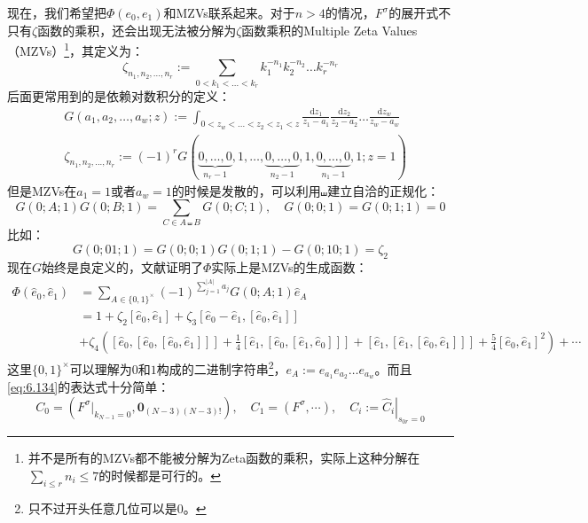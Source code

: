 现在，我们希望把$\Phi(e_0,e_1)$和MZVs联系起来。对于$n>4$的情况，$F^\sigma$的展开式不只有$\zeta$函数的乘积，还会出现无法被分解为$\zeta$函数乘积的Multiple Zeta Values（MZVs）\footnote{并不是所有的MZVs都不能被分解为Zeta函数的乘积，实际上这种分解在$\sum_{i\leq r} n_i \leq 7$的时候都是可行的。\cite{Blumlein:2009cf}}，其定义为：
\begin{equation}
	\zeta_{n_1,n_2,...,n_r}:=\sum_{0<k_1<...<k_r}k_1^{-n_1}k_2^{-n_2}\ldots k_r^{-n_r}
\end{equation}
后面更常用到的是依赖对数积分的定义：
\begin{equation}
	\begin{aligned}
		&G(a_1,a_2,\ldots,a_w;z) :=\int_{0<z_w<...<z_2<z_1<z}\frac{\mathrm{d}z_1}{z_1-a_1}\frac{\mathrm{d}z_2}{z_2-a_2}\ldots\frac{\mathrm{d}z_w}{z_w-a_w}\\
		&\zeta_{n_1,n_2,...,n_r}:=(-1)^rG(\underbrace{0,\ldots,0}_{n_r-1},1,\ldots,\underbrace{0,\ldots,0}_{n_2-1},1,\underbrace{0,\ldots,0}_{n_1-1},1;z=1)
	\end{aligned} 
\end{equation}
但是MZVs在$a_1=1$或者$a_w=1$的时候是发散的，可以利用$\shuffle$建立自洽的正规化：
\begin{equation}
	G(0;A;1)G(0;B;1)=\sum_{C\in A\shuffle B}G(0;C;1),\quad G(0;0;1)=G(0;1;1)=0
\end{equation}
比如：
\begin{equation}
	G(0;01;1)=G(0;0;1)G(0;1;1)-G(0;10;1)=\zeta_2
\end{equation}
现在$G$始终是良定义的，文献\cite{Le199639}证明了$\Phi$实际上是MZVs的生成函数：
\begin{equation}
	\begin{aligned}
		\Phi(\hat{e}_0,\hat{e}_1) &= \sum_{A\in\{0,1\}^\times}(-1)^{\sum_{j=1}^{|A|}a_j}G(0;A;1)\hat{e}_A \\
		&= 1 + \zeta_2[\hat{e}_0,\hat{e}_1] + \zeta_3[\hat{e}_0-\hat{e}_1,[\hat{e}_0,\hat{e}_1]] \\
		&+ \zeta_4\left([\hat{e}_0,[\hat{e}_0,[\hat{e}_0,\hat{e}_1]]] + \frac{1}{4}[\hat{e}_1,[\hat{e}_0,[\hat{e}_1,\hat{e}_0]]]+ [\hat{e}_1,[\hat{e}_1,[\hat{e}_0,\hat{e}_1]]] + \frac{5}{4}[\hat{e}_0,\hat{e}_1]^2\right) + \cdots
	\end{aligned}
\end{equation}
这里$\{0,1\}^\times$可以理解为$0$和$1$构成的二进制字符串\footnote{只不过开头任意几位可以是$0$。}，$e_A:=e_{a_1}e_{a_2}\ldots e_{a_w}$。而且\ref{eq:6.134}的表达式十分简单：
\begin{equation}
	C_0=(F^\sigma|_{k_{N-1}=0},\mathbf{0}_{(N-3)(N-3)!}),\quad C_1=(F^\sigma,\cdots),\quad C_i:=\left.\hat{C}_i\right|_{s_{0r} =0}
\end{equation}
